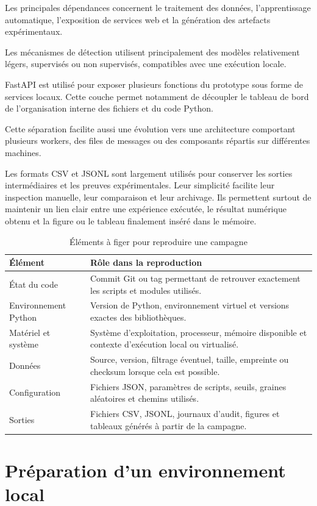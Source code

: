 Les principales dépendances concernent le traitement des données, l'apprentissage automatique, l'exposition de services web et la génération des artefacts expérimentaux.

Les mécanismes de détection utilisent principalement des modèles relativement légers, supervisés ou non supervisés, compatibles avec une exécution locale.

FastAPI est utilisé pour exposer plusieurs fonctions du prototype sous forme de services locaux. Cette couche permet notamment de découpler le tableau de bord de l'organisation interne des fichiers et du code Python.

Cette séparation facilite aussi une évolution vers une architecture comportant plusieurs workers, des files de messages ou des composants répartis sur différentes machines.

Les formats CSV et JSONL sont largement utilisés pour conserver les sorties intermédiaires et les preuves expérimentales. Leur simplicité facilite leur inspection manuelle, leur comparaison et leur archivage. Ils permettent surtout de maintenir un lien clair entre une expérience exécutée, le résultat numérique obtenu et la figure ou le tableau finalement inséré dans le mémoire.

\begin{table}[H]
\centering
\caption{Éléments à figer pour reproduire une campagne}
\label{tab:fiche-reproductibilite-figee}
\scriptsize
\begin{tabularx}{\textwidth}{p{3.2cm}X}
\toprule
\textbf{Élément} & \textbf{Rôle dans la reproduction} \tabularnewline
\midrule
État du code & Commit Git ou tag permettant de retrouver exactement les scripts et modules utilisés. \tabularnewline
Environnement Python & Version de Python, environnement virtuel et versions exactes des bibliothèques. \tabularnewline
Matériel et système & Système d'exploitation, processeur, mémoire disponible et contexte d'exécution local ou virtualisé. \tabularnewline
Données & Source, version, filtrage éventuel, taille, empreinte ou checksum lorsque cela est possible. \tabularnewline
Configuration & Fichiers JSON, paramètres de scripts, seuils, graines aléatoires et chemins utilisés. \tabularnewline
Sorties & Fichiers CSV, JSONL, journaux d'audit, figures et tableaux générés à partir de la campagne. \tabularnewline
\bottomrule
\end{tabularx}
\end{table}

\section{Préparation d'un environnement local}

